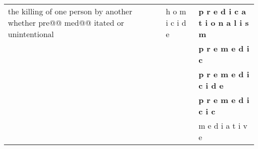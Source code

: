 \documentclass[11pt]{article}
\begin{document}
\begin{spacing}{1}
\begin{table}[!htpb]
\begin{tabular}{p{8cm} l p{5cm}}
the killing of one person by another whether pre@@ med@@ itated or unintentional & h o m i c i d e & \textbf{p r e d i c a t i o n a l i s m}                                                                                                                                                                                                                                                                                                                                                                                 \\
                                                                                 &                 & \textbf{p r e m e d i c}                                                                                                                                                                                                                                                                                                                                                                                                 \\
                                                                                 &                 & \textbf{p r e m e d i c i d e}                                                                                                                                                                                                                                                                                                                                                                                           \\
                                                                                 &                 & \textbf{p r e m e d i c i c}                                                                                                                                                                                                                                                                                                                                                                                             \\
                                                                                 &                 & m e d i a t i v e                                                                                                                                                                                                                                                                                                                                                                                               \\

\end{tabular}
\end{table}
\end{spacing}
\end{document}
